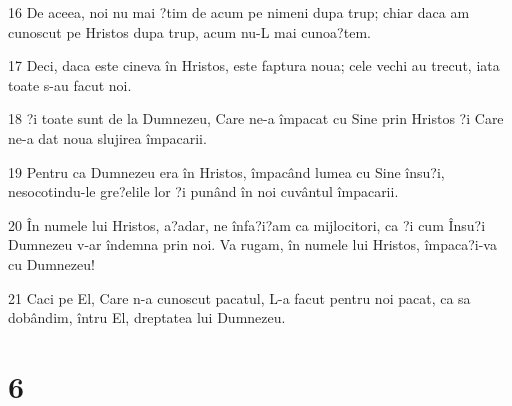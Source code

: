 \par 16 De aceea, noi nu mai ?tim de acum pe nimeni dupa trup; chiar daca am cunoscut pe Hristos dupa trup, acum nu-L mai cunoa?tem.
\par 17 Deci, daca este cineva în Hristos, este faptura noua; cele vechi au trecut, iata toate s-au facut noi.
\par 18 ?i toate sunt de la Dumnezeu, Care ne-a împacat cu Sine prin Hristos ?i Care ne-a dat noua slujirea împacarii.
\par 19 Pentru ca Dumnezeu era în Hristos, împacând lumea cu Sine însu?i, nesocotindu-le gre?elile lor ?i punând în noi cuvântul împacarii.
\par 20 În numele lui Hristos, a?adar, ne înfa?i?am ca mijlocitori, ca ?i cum Însu?i Dumnezeu v-ar îndemna prin noi. Va rugam, în numele lui Hristos, împaca?i-va cu Dumnezeu!
\par 21 Caci pe El, Care n-a cunoscut pacatul, L-a facut pentru noi pacat, ca sa dobândim, întru El, dreptatea lui Dumnezeu.

\chapter{6}

